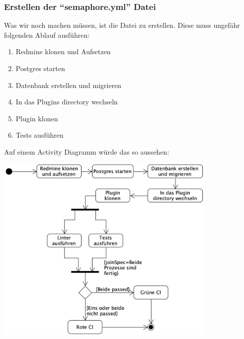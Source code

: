 \subsubsection{Erstellen der \enquote{semaphore.yml} Datei}
Was wir noch machen müssen, ist die  Datei zu erstellen. Diese muss ungefähr folgenden Ablauf
ausführen:
\begin{enumerate}
\item Redmine klonen und Aufsetzen
\item Postgres starten
\item Datenbank erstellen und migrieren
\item In das Plugins directory wechseln
\item Plugin klonen
\item Tests ausführen
\end{enumerate}

Auf einem Activity Diagramm würde das so aussehen: \newline
\begin{center}
  \includegraphics[width=0.8\textwidth]{images/activity/ci-cd.png}
  \label{fig:activity_ci_cd}
  \newline
\end{center}

